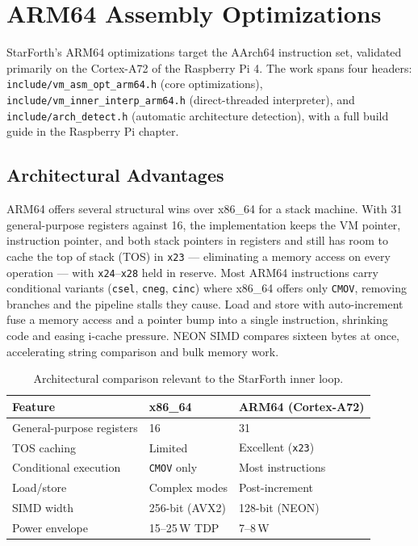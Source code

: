 
\section{ARM64 Assembly Optimizations}

StarForth's ARM64 optimizations target the AArch64 instruction set, validated
primarily on the Cortex-A72 of the Raspberry Pi 4. The work spans four headers:
\texttt{include/vm\_asm\_opt\_arm64.h} (core optimizations),
\texttt{include/vm\_inner\_interp\_arm64.h} (direct-threaded interpreter), and
\texttt{include/arch\_detect.h} (automatic architecture detection), with a full
build guide in the Raspberry Pi chapter.

\subsection{Architectural Advantages}

ARM64 offers several structural wins over x86\_64 for a stack machine. With 31
general-purpose registers against 16, the implementation keeps the VM pointer,
instruction pointer, and both stack pointers in registers and still has room to
cache the top of stack (TOS) in \texttt{x23} --- eliminating a memory access on
every operation --- with \texttt{x24}--\texttt{x28} held in reserve. Most ARM64
instructions carry conditional variants (\texttt{csel}, \texttt{cneg},
\texttt{cinc}) where x86\_64 offers only \texttt{CMOV}, removing branches and the
pipeline stalls they cause. Load and store with auto-increment fuse a memory
access and a pointer bump into a single instruction, shrinking code and easing
i-cache pressure. NEON SIMD compares sixteen bytes at once, accelerating string
comparison and bulk memory work.

\begin{table}[h]
\centering
\begin{tabular}{lll}
\toprule
Feature & x86\_64 & ARM64 (Cortex-A72) \\
\midrule
General-purpose registers & 16 & 31 \\
TOS caching & Limited & Excellent (\texttt{x23}) \\
Conditional execution & \texttt{CMOV} only & Most instructions \\
Load/store & Complex modes & Post-increment \\
SIMD width & 256-bit (AVX2) & 128-bit (NEON) \\
Power envelope & 15--25\,W TDP & 7--8\,W \\
\bottomrule
\end{tabular}
\caption{Architectural comparison relevant to the StarForth inner loop.}
\end{table}

